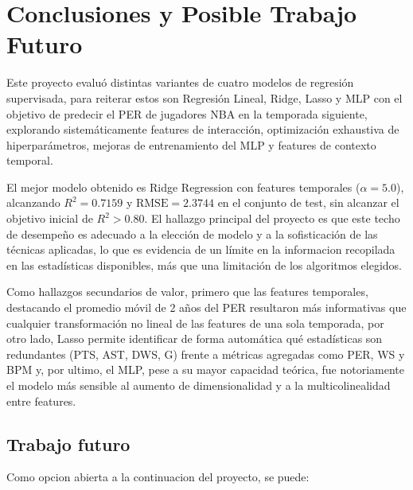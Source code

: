 \documentclass[11pt,a4paper]{article}
\begin{document}
\section{Conclusiones y Posible Trabajo Futuro}
\label{sec:futuro}

Este proyecto evaluó distintas variantes de cuatro modelos de regresión
supervisada, para reiterar estos son Regresión Lineal, Ridge, Lasso y MLP con el objetivo de predecir el PER de
jugadores NBA en la temporada siguiente, explorando sistemáticamente
features de interacción, optimización exhaustiva de hiperparámetros,
mejoras de entrenamiento del MLP y features de contexto temporal.

El mejor modelo obtenido es Ridge Regression con features
temporales ($\alpha=5.0$), alcanzando $R^2=0.7159$ y $\text{RMSE}=2.3744$
en el conjunto de test, sin alcanzar el objetivo inicial de
$R^2 > 0.80$. El hallazgo principal del proyecto es que este techo de
desempeño es adecuado a la elección de modelo y a la sofisticación
de las técnicas aplicadas, lo que es evidencia de un límite
en la informacion recopilada en las estadísticas disponibles, más que una
limitación de los algoritmos elegidos.

Como hallazgos secundarios de valor, primero que las features temporales, destacando el promedio móvil de 2 años del PER resultaron más
informativas que cualquier transformación no lineal de las features de una
sola temporada, por otro lado, Lasso permite identificar de forma automática qué
estadísticas son redundantes (PTS, AST, DWS, G) frente a métricas
agregadas como PER, WS y BPM y, por ultimo, el MLP, pese a su mayor capacidad
teórica, fue notoriamente el modelo más sensible al aumento de
dimensionalidad y a la multicolinealidad entre features.

\subsection*{Trabajo futuro}

Como opcion abierta a la continuacion del proyecto, se puede:
\end{document}
